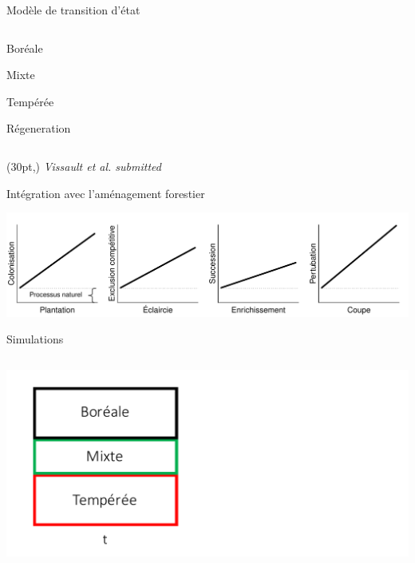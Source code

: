 \documentclass[11pt, compress, aspectratio=1610]{beamer}
\newcommand\smallcitation[1]{%
\begin{textblock*}{\textwidth}(30pt,\textheight)
	\raggedleft \footnotesize\textit{#1}
\end{textblock*}}
\providecommand{\tightlist}{%
  \setlength{\itemsep}{0pt}\setlength{\parskip}{0pt}}
\newcommand{\begincols}{\begin{columns}}
\newcommand{\stopcols}{\end{columns}}
\begin{document}
\begin{frame}{Modèle de transition d'état}

\begincols
{} 
\hfill{}

\begin{description}
\tightlist
\item[B]
Boréale
\item[M]
Mixte
\item[T]
Tempérée
\item[R]
Régeneration
\end{description}

\stopcols

\smallcitation{Vissault et al. submitted}

\end{frame}

\begin{frame}{Intégration avec l'aménagement forestier}

\centering
 \includegraphics[scale=0.65]{figures/managMechanism.pdf}\par

\end{frame}

\begin{frame}{Simulations}

\begincols
{}
\includegraphics[scale=0.50]{figures/migration0.pdf}
\hfill{}  \stopcols

\end{frame}
\end{document}
